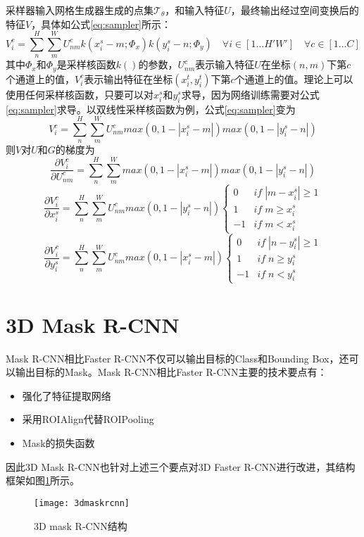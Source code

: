 采样器输入网格生成器生成的点集$\mathcal{T}_\theta$，和输入特征$U$，最终输出经过空间变换后的特征$V$，具体如公式\ref{eq:sampler}所示：
\begin{equation}
  \label{eq:sampler}
  V_i^c = \sum_n^H\sum_m^W{U_{nm}^ck(x_i^s-m;\Phi_x)k(y_i^s-n;\Phi_y)}\quad \forall i\in[1\ldots H'W']\quad \forall c\in[1\ldots C]
\end{equation}
其中$\Phi_{x}$和$\Phi_{y}$是采样核函数$k()$的参数，$U_{nm}^c$表示输入特征$U$在坐标$(n, m)$下第$c$个通道上的值，$V_i^c$表示输出特征在坐标$(x_i^t,y_i^t)$下第$c$个通道上的值。理论上可以使用任何采样核函数，只要可以对$x_i^s$和$y_i^s$求导，因为网络训练需要对公式\ref{eq:sampler}求导。以双线性采样核函数为例，公式\ref{eq:sampler}变为
\begin{equation}
  V_i^c = \sum_n^H\sum_m^W{U_{nm}^cmax(0, 1-|x_i^s-m|)max(0, 1-|y_i^s-n|)}
\end{equation}
则$V$对$U$和$G$的梯度为
\begin{equation}
  \frac{\partial V_i^c}{\partial U_{nm}^c} = \sum_n^H\sum_m^W{max(0, 1-|x_i^s-m|)max(0, 1-|y_i^s-n|)}
\end{equation}
\begin{equation}
  \frac{\partial V_i^c}{\partial x_i^s} = \sum_n^H\sum_m^W{U_{nm}^cmax(0, 1-|y_i^s-n|)}
  \left\{
      \begin{array}{ll}
        0&if\; |m-x_i^s| \geq 1\\
        1&if\; m \geq x_i^s\\
        -1&if\; m < x_i^s
      \end{array}
    \right.
\end{equation}
\begin{equation}
  \frac{\partial V_i^c}{\partial y_i^s} = \sum_n^H\sum_m^W{U_{nm}^cmax(0, 1-|x_i^s-m|)}
  \left\{
      \begin{array}{ll}
        0&if\; |n-y_i^s| \geq 1\\
        1&if\; n \geq y_i^s\\
        -1&if\; n < y_i^s
      \end{array}
    \right.
\end{equation}


\section{3D Mask R-CNN}
Mask R-CNN相比Faster R-CNN不仅可以输出目标的Class和Bounding Box，还可以输出目标的Mask。Mask R-CNN相比Faster R-CNN主要的技术要点有：
\begin{itemize}
\item 强化了特征提取网络
\item 采用ROIAlign代替ROIPooling
\item Mask的损失函数
\end{itemize}
因此3D Mask R-CNN也针对上述三个要点对3D Faster R-CNN进行改进，其结构框架如图\ref{fig:3d_mask_rcnn}所示。
\begin{figure}[ht]
  \centering
  \texttt{[image: 3dmaskrcnn]}
  \caption{3D mask R-CNN结构}
  \label{fig:3d_mask_rcnn}
\end{figure}

